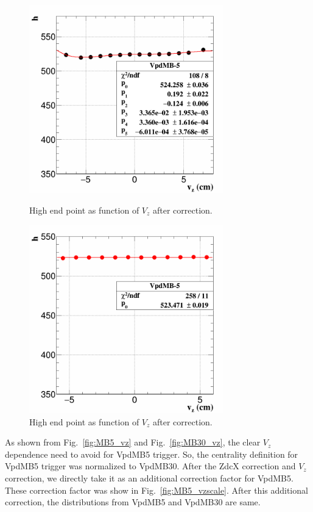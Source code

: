 \documentclass[a4paper]{article}
\begin{document}
\begin{figure}[htbp]
\begin{minipage}[htbp]{0.52\linewidth}
\centering
\includegraphics[width=0.75\textwidth]{fig/MB5_Vzcor2.png}
\caption{High end point as function of $V_{z}$ after correction.\label{fig:MB5_vz2}}
\end{minipage}
\hfill
\begin{minipage}[htbp]{0.52\linewidth}
\centering
\includegraphics[width=0.75\textwidth]{fig/MB5_Vzcor3.png} 
\caption{High end point  as function of $V_{z}$ after correction.\label{fig:MB5_vz3}}
\end{minipage}
\end{figure}

As shown from Fig.~\ref{fig:MB5_vz} and Fig.~\ref{fig:MB30_vz}, the clear $V_{z}$ dependence need to avoid for VpdMB5 trigger. So, the centrality definition for VpdMB5 trigger was normalized to VpdMB30. After the ZdcX correction and $V_{z}$ correction, we directly take it as an additional correction factor for VpdMB5. These correction factor was show in Fig.~\ref{fig:MB5_vzscale}. After this additional correction, the distributions from VpdMB5 and VpdMB30 are same.
\end{document}
